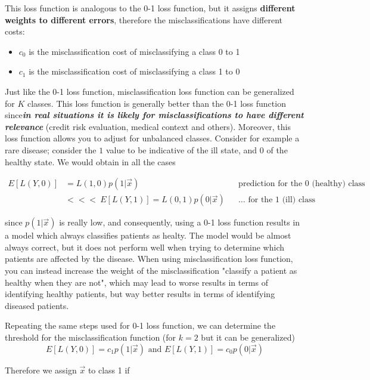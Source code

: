     This loss function is analogous to the 0-1 loss function, but it assigns
    \textbf{different weights to different errors}, therefore the
    misclassifications have different costs:
    \begin{itemize}
      \item $c_0$ is the misclassification cost of misclassifying a class 0 to 1
      \item $c_1$ is the misclassification cost of misclassifying a class 1 to 0
    \end{itemize}
    Just like the 0-1 loss function, misclassification loss function can be
    generalized for $K$ classes. This loss function is generally better than the
    0-1 loss function since\textbf{\textit{in real situations it is likely for
    misclassifications to have different relevance}} (credit risk evaluation,
    medical context and others). Moreover, this loss function allows you to
    adjust for unbalanced classes. Consider for example a rare disease; consider
    the $1$ value to be indicative of the ill state, and 0 of the healthy state.
    We would obtain in all the cases
    
    \begin{align*}
      E[L(Y,0)] &= L(1, 0)p(1|\vec{x}) &&\text{prediction for the $0$ (healthy) class}\\
      &<<<\: E[L(Y,1)] = L(0, 1)p(0|\vec{x}) &&\text{$\dots$ for the $1$ (ill) class}
    \end{align*}
    $$ $$
    
    since $p(1|\vec{x})$ is really low, and consequently, using a 0-1 loss
    function results in a model which always classifies patients as healty.
    The model would be almost always correct, but it does not perform well when
    trying to determine which patients are affected by the disease. When using
    misclassification loss function, you can instead increase the weight of the
    misclassification "classify a patient as healthy when they are not", which
    may lead to worse results in terms of identifying healthy patients, but way
    better results in terms of identifying diseased patients.
    
    Repeating the same steps used for 0-1 loss function, we can determine the
    threshold for the misclassification function (for $k=2$ but it can be
    generalized)
    $$E[L(Y,0)] = c_1 p(1|\vec{x}) \text{ and } E[L(Y,1)] = c_0 p(0|\vec{x})$$
  
    Therefore we assign $\vec{x}$ to class 1 if 

